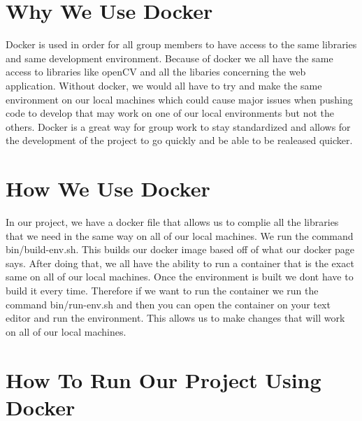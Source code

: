 \hypertarget{how_to_use_docker_why_we_use_docker}{}\section{Why We Use Docker}\label{how_to_use_docker_why_we_use_docker}
Docker is used in order for all group members to have access to the same libraries and same development environment. Because of docker we all have the same access to libraries like open\+CV and all the libaries concerning the web application. Without docker, we would all have to try and make the same environment on our local machines which could cause major issues when pushing code to develop that may work on one of our local environments but not the others. Docker is a great way for group work to stay standardized and allows for the development of the project to go quickly and be able to be realeased quicker.\hypertarget{how_to_use_docker_how_we_use_docker}{}\section{How We Use Docker}\label{how_to_use_docker_how_we_use_docker}
In our project, we have a docker file that allows us to complie all the libraries that we need in the same way on all of our local machines. We run the command bin/build-\/env.\+sh. This builds our docker image based off of what our docker page says. After doing that, we all have the ability to run a container that is the exact same on all of our local machines. Once the environment is built we don\textquotesingle{}t have to build it every time. Therefore if we want to run the container we run the command bin/run-\/env.\+sh and then you can open the container on your text editor and run the environment. This allows us to make changes that will work on all of our local machines.\hypertarget{how_to_use_docker_how_to_run_our_project_using_docker}{}\section{How To Run Our Project Using Docker}\label{how_to_use_docker_how_to_run_our_project_using_docker}
